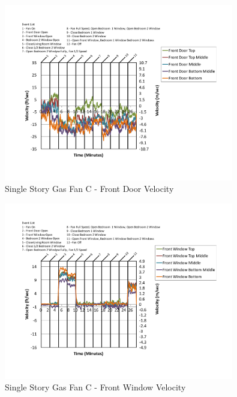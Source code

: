 \documentclass{article}
\begin{document}
\begin{appendices}
	\begin{figure}[H]
		\centering
		\includegraphics[height=3.05in,trim=0.67in 1.1in 0.67in 0.8in,clip=true]{0_Images/Results_Charts/ColdFlow/Single_Story/Gas/C/Front_Door_Velocity.pdf}
		\caption{Single Story Gas Fan C - Front Door Velocity}
	\end{figure}
 

	\begin{figure}[H]
		\centering
		\includegraphics[height=3.05in,trim=0.67in 1.1in 0.67in 0.8in,clip=true]{0_Images/Results_Charts/ColdFlow/Single_Story/Gas/C/Front_Window_Velocity.pdf}
		\caption{Single Story Gas Fan C - Front Window Velocity}
	\end{figure}
 
	\clearpage


\end{appendices}
\end{document}
